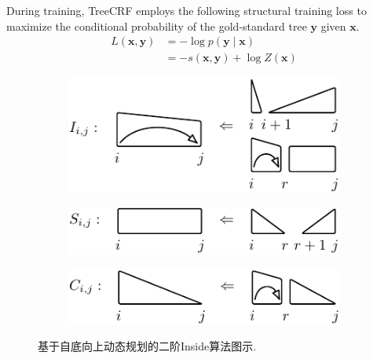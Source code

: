 During training, TreeCRF employs the following structural training loss to
maximize the conditional probability of the gold-standard tree $\boldsymbol{y}$ given $\boldsymbol{x}$.
\begin{equation}\label{equation:training-loss-treecrf}
    \begin{split}
        \mathit{L}(\boldsymbol{x},\boldsymbol{y}) &= -\log p(\boldsymbol{y}\mid\boldsymbol{x})  \\
        &= - s(\boldsymbol{x}, \boldsymbol{y}) + \log Z(\boldsymbol{x})
    \end{split}
\end{equation}

\begin{figure}[tb]
    \centering
    \begin{subfigure}[b]{\textwidth}
        \begin{minipage}{\textwidth}
            \centering
            \includegraphics{figures/eisner-2o/a.pdf}
            \label{fig:eisner-2o-a}
        \end{minipage}
    \end{subfigure}
    \begin{subfigure}[b]{\textwidth}
        \begin{minipage}{\textwidth}
            \centering
            \includegraphics{figures/eisner-2o/b.pdf}
            \label{fig:eisner-2o-b}
        \end{minipage}
    \end{subfigure}
    \begin{subfigure}[b]{\textwidth}
        \begin{minipage}{\textwidth}
            \centering
            \includegraphics{figures/eisner-2o/c.pdf}
            \label{fig:eisner-2o-c}
        \end{minipage}
    \end{subfigure}
    \caption{基于自底向上动态规划的二阶Inside算法图示.}
    \label{fig:eisner-2o}
\end{figure}

